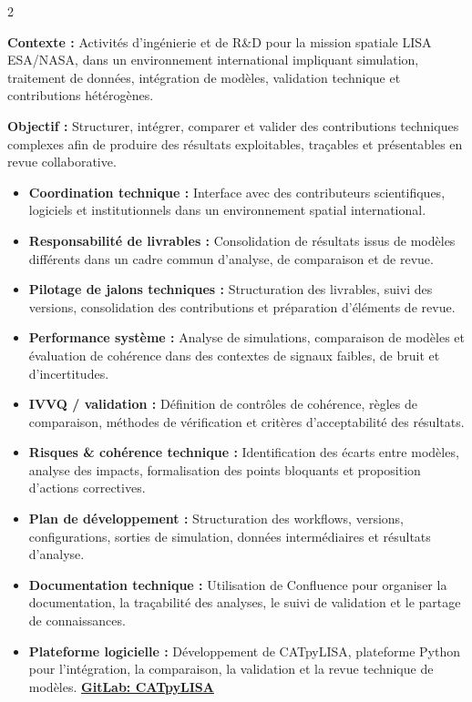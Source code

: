 \documentclass[8pt,a4paper,ragged2e,withhyper]{altacv}
\begin{document}
\begin{paracol}{2}
\divider


\textbf{Contexte :} Activités d’ingénierie et de R\&D pour la mission spatiale LISA ESA/NASA, dans un environnement international impliquant simulation, traitement de données, intégration de modèles, validation technique et contributions hétérogènes.

\textbf{Objectif :} Structurer, intégrer, comparer et valider des contributions techniques complexes afin de produire des résultats exploitables, traçables et présentables en revue collaborative.

\begin{itemize}
  \item \textbf{Coordination technique :} Interface avec des contributeurs scientifiques, logiciels et institutionnels dans un environnement spatial international.
  \item \textbf{Responsabilité de livrables :} Consolidation de résultats issus de modèles différents dans un cadre commun d’analyse, de comparaison et de revue.
  \item \textbf{Pilotage de jalons techniques :} Structuration des livrables, suivi des versions, consolidation des contributions et préparation d’éléments de revue.
  \item \textbf{Performance système :} Analyse de simulations, comparaison de modèles et évaluation de cohérence dans des contextes de signaux faibles, de bruit et d’incertitudes.
  \item \textbf{IVVQ / validation :} Définition de contrôles de cohérence, règles de comparaison, méthodes de vérification et critères d’acceptabilité des résultats.
  \item \textbf{Risques \& cohérence technique :} Identification des écarts entre modèles, analyse des impacts, formalisation des points bloquants et proposition d’actions correctives.
  \item \textbf{Plan de développement :} Structuration des workflows, versions, configurations, sorties de simulation, données intermédiaires et résultats d’analyse.
  \item \textbf{Documentation technique :} Utilisation de Confluence pour organiser la documentation, la traçabilité des analyses, le suivi de validation et le partage de connaissances.
  \item \textbf{Plateforme logicielle :} Développement de CATpyLISA, plateforme Python pour l’intégration, la comparaison, la validation et la revue technique de modèles.
  \textcolor{DarkPastelRed}{\href{https://gitlab.oca.eu/gboileau/lisa_l3_tools}{\bf GitLab: CATpyLISA}}
\end{itemize}


\end{paracol}
\end{document}
